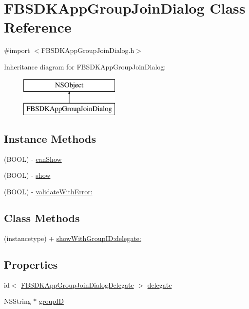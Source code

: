 \hypertarget{interface_f_b_s_d_k_app_group_join_dialog}{}\section{F\+B\+S\+D\+K\+App\+Group\+Join\+Dialog Class Reference}
\label{interface_f_b_s_d_k_app_group_join_dialog}


{\ttfamily \#import $<$F\+B\+S\+D\+K\+App\+Group\+Join\+Dialog.\+h$>$}

Inheritance diagram for F\+B\+S\+D\+K\+App\+Group\+Join\+Dialog\+:\begin{figure}[H]
\begin{center}
\leavevmode
\includegraphics[height=2.000000cm]{interface_f_b_s_d_k_app_group_join_dialog}
\end{center}
\end{figure}
\subsection*{Instance Methods}
\begin{DoxyCompactItemize}
\item 
(B\+O\+O\+L) -\/ \hyperlink{interface_f_b_s_d_k_app_group_join_dialog_a3bf5924eb50f3694d7b57c11e723e74c}{can\+Show}
\item 
(B\+O\+O\+L) -\/ \hyperlink{interface_f_b_s_d_k_app_group_join_dialog_a700d110bc5ab9e0671551c794a733cd2}{show}
\item 
(B\+O\+O\+L) -\/ \hyperlink{interface_f_b_s_d_k_app_group_join_dialog_ac5b458a8ac19314578e773c72ccaf84f}{validate\+With\+Error\+:}
\end{DoxyCompactItemize}
\subsection*{Class Methods}
\begin{DoxyCompactItemize}
\item 
(instancetype) + \hyperlink{interface_f_b_s_d_k_app_group_join_dialog_a0d3ac5886ce882f57393e5e950ea4aa0}{show\+With\+Group\+I\+D\+:delegate\+:}
\end{DoxyCompactItemize}
\subsection*{Properties}
\begin{DoxyCompactItemize}
\item 
id$<$ \hyperlink{protocol_f_b_s_d_k_app_group_join_dialog_delegate-p}{F\+B\+S\+D\+K\+App\+Group\+Join\+Dialog\+Delegate} $>$ \hyperlink{interface_f_b_s_d_k_app_group_join_dialog_a3ee58c32085dab11678cbd1805d62231}{delegate}
\item 
N\+S\+String $\ast$ \hyperlink{interface_f_b_s_d_k_app_group_join_dialog_aceeba0e2821c837cd9ae2caf3d6ea890}{group\+I\+D}
\end{DoxyCompactItemize}


